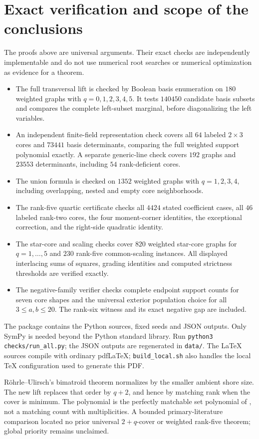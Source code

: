 \section{Exact verification and scope of the conclusions}\label{sec:verification}
The proofs above are universal arguments. Their exact checks are independently implementable and do not use numerical root searches or numerical optimization as evidence for a theorem.
\begin{itemize}
\item The full transversal lift is checked by Boolean basis enumeration on $180$ weighted graphs with $q=0,1,2,3,4,5$. It tests $140450$ candidate basis subsets and compares the complete left-subset marginal, before diagonalizing the left variables.
\item An independent finite-field representation check covers all $64$ labeled $2\times3$ cores and $73441$ basis determinants, comparing the full weighted support polynomial exactly. A separate generic-line check covers $192$ graphs and $23553$ determinants, including $54$ rank-deficient cores.
\item The union formula is checked on $1352$ weighted graphs with $q=1,2,3,4$, including overlapping, nested and empty core neighborhoods.
\item The rank-five quartic certificate checks all $4424$ stated coefficient cases, all $46$ labeled rank-two cores, the four moment-corner identities, the exceptional correction, and the right-side quadratic identity.
\item The star-core and scaling checks cover $820$ weighted star-core graphs for $q=1,\ldots,5$ and $230$ rank-five common-scaling instances. All displayed interlacing sums of squares, grading identities and computed strictness thresholds are verified exactly.
\item The negative-family verifier checks complete endpoint support counts for seven core shapes and the universal exterior population choice for all $3\le a,b\le20$. The rank-six witness and its exact negative gap are included.
\end{itemize}
The package contains the Python sources, fixed seeds and JSON outputs. Only SymPy is needed beyond the Python standard library. Run \texttt{python3 checks/run\_all.py}; the JSON outputs are regenerated in \texttt{data/}. The LaTeX sources compile with ordinary pdfLaTeX; \texttt{build\_local.sh} also handles the local TeX configuration used to generate this PDF.

R\"ohrle--Ulirsch's bimatroid theorem \cite{RU} normalizes by the smaller ambient shore size. The new lift replaces that order by $q+2$, and hence by matching rank when the cover is minimum. The polynomial is the perfectly matchable set polynomial of \cite{DK}, not a matching count with multiplicities. A bounded primary-literature comparison located no prior universal $2+q$-cover or weighted rank-five theorem; global priority remains unclaimed.


